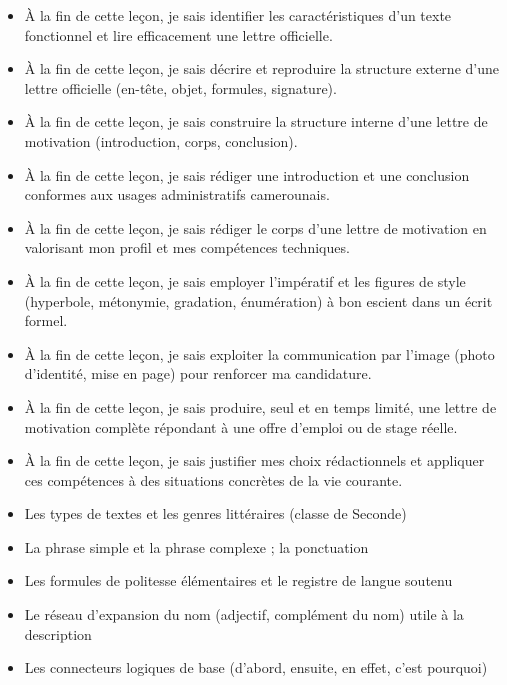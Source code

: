 \documentclass[11pt]{article}
\begin{document}
\begin{objectifs}
\begin{itemize}
\item À la fin de cette leçon, je sais identifier les caractéristiques d'un texte fonctionnel et lire efficacement une lettre officielle.
\item À la fin de cette leçon, je sais décrire et reproduire la structure externe d'une lettre officielle (en-tête, objet, formules, signature).
\item À la fin de cette leçon, je sais construire la structure interne d'une lettre de motivation (introduction, corps, conclusion).
\item À la fin de cette leçon, je sais rédiger une introduction et une conclusion conformes aux usages administratifs camerounais.
\item À la fin de cette leçon, je sais rédiger le corps d'une lettre de motivation en valorisant mon profil et mes compétences techniques.
\item À la fin de cette leçon, je sais employer l'impératif et les figures de style (hyperbole, métonymie, gradation, énumération) à bon escient dans un écrit formel.
\item À la fin de cette leçon, je sais exploiter la communication par l'image (photo d'identité, mise en page) pour renforcer ma candidature.
\item À la fin de cette leçon, je sais produire, seul et en temps limité, une lettre de motivation complète répondant à une offre d'emploi ou de stage réelle.
\item À la fin de cette leçon, je sais justifier mes choix rédactionnels et appliquer ces compétences à des situations concrètes de la vie courante.
\end{itemize}
\end{objectifs}

\begin{prerequis}
\begin{itemize}
\item Les types de textes et les genres littéraires (classe de Seconde)
\item La phrase simple et la phrase complexe ; la ponctuation
\item Les formules de politesse élémentaires et le registre de langue soutenu
\item Le réseau d'expansion du nom (adjectif, complément du nom) utile à la description
\item Les connecteurs logiques de base (d'abord, ensuite, en effet, c'est pourquoi)
\end{itemize}
\end{prerequis}
\end{document}
